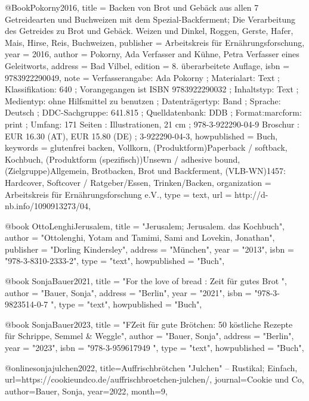 @Book{Pokorny2016,
  title        = {Backen von Brot und Gebäck aus allen 7 Getreidearten und Buchweizen mit dem Spezial-Backferment; Die Verarbeitung des Getreides zu Brot und Gebäck. Weizen und Dinkel, Roggen, Gerste, Hafer, Mais, Hirse, Reis, Buchweizen},
  publisher    = {Arbeitskreis für Ernährungsforschung},
  year         = {2016},
  author       = {Pokorny, Ada Verfasser and Kühne, Petra Verfasser eines Geleitworts},
  address      = {Bad Vilbel},
  edition      = {8. überarbeitete Auflage},
  isbn         = {9783922290049},
  note         = {Verfasserangabe: Ada Pokorny ; Materialart: Text ; Klassifikation: 640 ; Vorangegangen ist ISBN 9783922290032 ; Inhaltstyp: Text ; Medientyp: ohne Hilfsmittel zu benutzen ; Datenträgertyp: Band ; Sprache: Deutsch ; DDC-Sachgruppe: 641.815 ; Quelldatenbank: DDB ; Format:marcform: print ; Umfang: 171 Seiten : Illustrationen, 21 cm ; 978-3-922290-04-9 Broschur : EUR 16.30 (AT), EUR 15.80 (DE) ; 3-922290-04-3},
  howpublished = {Buch},
  keywords     = {glutenfrei backen, Vollkorn, (Produktform)Paperback / softback, Kochbuch, (Produktform (spezifisch))Unsewn / adhesive bound, (Zielgruppe)Allgemein, Brotbacken, Brot und Backferment, (VLB-WN)1457: Hardcover, Softcover / Ratgeber/Essen, Trinken/Backen},
  organization = {Arbeitskreis für Ernährungsforschung e.V.},
  type         = {text},
  url          = {http://d-nb.info/1090913273/04},
}

@book { OttoLenghiJerusalem,
	title = "Jerusalem; Jerusalem. das Kochbuch",
	author = "Ottolenghi, Yotam and Tamimi, Sami and Lovekin, Jonathan",
	publisher = "Dorling Kindersley",
	address = "München",
	year = "2013",
	isbn = "978-3-8310-2333-2",
	type = "text",
	howpublished = "Buch",
}

@book {SonjaBauer2021,
    title = "For the love of bread : Zeit für gutes Brot ",
    author = "Bauer, Sonja",
    address = "Berlin",
    year = "2021",
    isbn = "978-3-9823514-0-7 ",
    type = "text",
    howpublished = "Buch",
}

@book {SonjaBauer2023,
    title = "FZeit für gute Brötchen: 50 köstliche Rezepte für Schrippe, Semmel & Weggle",
    author = "Bauer, Sonja",
    address = "Berlin",
    year = "2023",
    isbn = "978-3-959617949 ",
    type = "text",
    howpublished = "Buch",
}

@online{sonjajulchen2022,
    title={Auffrischbrötchen "Julchen" – Rustikal; Einfach}, 
    url={https://cookieundco.de/auffrischbroetchen-julchen/}, 
    journal={Cookie und Co}, 
    author={Bauer, Sonja}, 
    year={2022}, 
    month={9},
}

